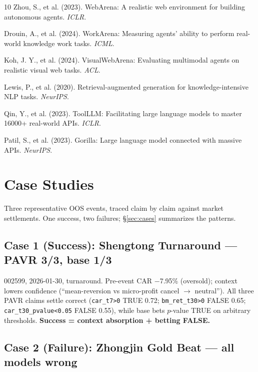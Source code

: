 \documentclass[sigconf, anonymous, review]{acmart}
\begin{document}
\begin{thebibliography}{10}
Zhou, S., et al. (2023). WebArena: A realistic web environment for building autonomous agents. \emph{ICLR}.

Drouin, A., et al. (2024). WorkArena: Measuring agents' ability to perform real-world knowledge work tasks. \emph{ICML}.

Koh, J. Y., et al. (2024). VisualWebArena: Evaluating multimodal agents on realistic visual web tasks. \emph{ACL}.

Lewis, P., et al. (2020). Retrieval-augmented generation for knowledge-intensive NLP tasks. \emph{NeurIPS}.

Qin, Y., et al. (2023). ToolLLM: Facilitating large language models to master 16000+ real-world APIs. \emph{ICLR}.

Patil, S., et al. (2023). Gorilla: Large language model connected with massive APIs. \emph{NeurIPS}.

\end{thebibliography}

\appendix

\section{Case Studies}
\label{app:cases}

Three representative OOS events, traced claim by claim against market settlements. One success, two failures; \S\ref{sec:cases} summarizes the patterns.

\subsection*{Case 1 (Success): Shengtong Turnaround --- PAVR 3/3, base 1/3}

002599, 2026-01-30, turnaround. Pre-event CAR $-$7.95\% (oversold); context lowers confidence (``mean-reversion vs micro-profit cancel $\to$ neutral''). All three PAVR claims settle correct (\texttt{car\_t7>0} TRUE 0.72; \texttt{bm\_ret\_t30>0} FALSE 0.65; \texttt{car\_t30\_pvalue<0.05} FALSE 0.55), while base bets $p$-value TRUE on arbitrary thresholds. \textbf{Success = context absorption + betting FALSE.}

\subsection*{Case 2 (Failure): Zhongjin Gold Beat --- all models wrong}
\end{document}
